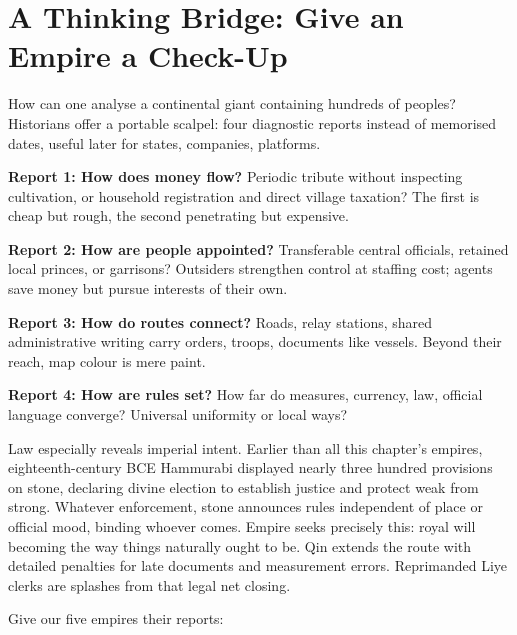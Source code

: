 \section[Thinking Bridge: An Imperial Check-Up]{A Thinking Bridge: Give an Empire a Check-Up}
How can one analyse a continental giant containing hundreds of peoples? Historians offer a portable scalpel: four diagnostic reports instead of memorised dates, useful later for states, companies, platforms.

\textbf{Report 1: How does money flow?} Periodic tribute without inspecting cultivation, or household registration and direct village taxation? The first is cheap but rough, the second penetrating but expensive.

\textbf{Report 2: How are people appointed?} Transferable central officials, retained local princes, or garrisons? Outsiders strengthen control at staffing cost; agents save money but pursue interests of their own.

\textbf{Report 3: How do routes connect?} Roads, relay stations, shared administrative writing carry orders, troops, documents like vessels. Beyond their reach, map colour is mere paint.

\textbf{Report 4: How are rules set?} How far do measures, currency, law, official language converge? Universal uniformity or local ways?

Law especially reveals imperial intent. Earlier than all this chapter's empires, eighteenth-century BCE Hammurabi displayed nearly three hundred provisions on stone, declaring divine election to establish justice and protect weak from strong. Whatever enforcement, stone announces rules independent of place or official mood, binding whoever comes. Empire seeks precisely this: royal will becoming the way things naturally ought to be. Qin extends the route with detailed penalties for late documents and measurement errors. Reprimanded Liye clerks are splashes from that legal net closing.

Give our five empires their reports:

